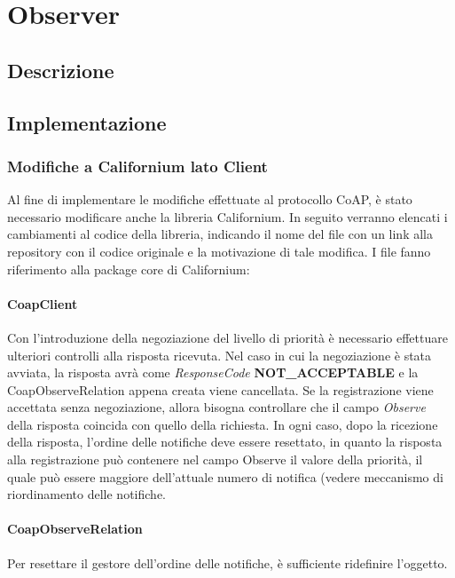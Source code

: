 \chapter{Observer}
	\section {Descrizione}
	\section {Implementazione}
		\subsection {Modifiche a Californium lato Client}
			Al fine di implementare le modifiche effettuate al protocollo CoAP, è stato necessario modificare anche la libreria Californium. In seguito verranno elencati i cambiamenti al codice della libreria, indicando il nome del file con un link alla repository con il codice originale e la motivazione di tale modifica. I file fanno riferimento alla package core di Californium:
			\subsubsection{CoapClient}
				Con l'introduzione della negoziazione del livello di priorità è necessario effettuare ulteriori controlli alla risposta ricevuta. Nel caso in cui la negoziazione è stata avviata, la risposta avrà come \textit{ResponseCode} \textbf{NOT\_ACCEPTABLE} e la CoapObserveRelation appena creata viene cancellata. Se la registrazione viene accettata senza negoziazione, allora bisogna controllare che il campo \textit{Observe} della risposta coincida con quello della richiesta. In ogni caso, dopo la ricezione della risposta, l'ordine delle notifiche deve essere resettato, in quanto la risposta alla registrazione può contenere nel campo Observe il valore della priorità, il quale può essere maggiore dell'attuale numero di notifica (vedere meccanismo di riordinamento delle notifiche.\newline
				
			\subsubsection{CoapObserveRelation}
				Per resettare il gestore dell'ordine delle notifiche, è sufficiente ridefinire l'oggetto.\newline
				
